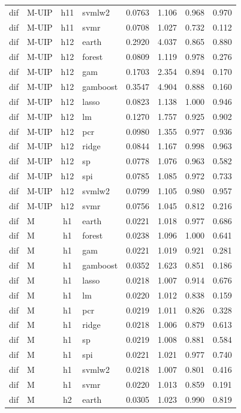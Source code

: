 \begin{ThreePartTable}
\begin{longtable}[t]{llclcccc}
dif & M-UIP & h11 & svmlw2 & 0.0763 & 1.106 & 0.968 & 0.970\\
dif & M-UIP & h11 & svmr & 0.0708 & 1.027 & 0.732 & 0.112\\
\addlinespace
dif & M-UIP & h12 & earth & 0.2920 & 4.037 & 0.865 & 0.880\\
dif & M-UIP & h12 & forest & 0.0809 & 1.119 & 0.978 & 0.276\\
dif & M-UIP & h12 & gam & 0.1703 & 2.354 & 0.894 & 0.170\\
dif & M-UIP & h12 & gamboost & 0.3547 & 4.904 & 0.888 & 0.160\\
dif & M-UIP & h12 & lasso & 0.0823 & 1.138 & 1.000 & 0.946\\
dif & M-UIP & h12 & lm & 0.1270 & 1.757 & 0.925 & 0.902\\
dif & M-UIP & h12 & pcr & 0.0980 & 1.355 & 0.977 & 0.936\\
dif & M-UIP & h12 & ridge & 0.0844 & 1.167 & 0.998 & 0.963\\
dif & M-UIP & h12 & sp & 0.0778 & 1.076 & 0.963 & 0.582\\
dif & M-UIP & h12 & spi & 0.0785 & 1.085 & 0.972 & 0.733\\
dif & M-UIP & h12 & svmlw2 & 0.0799 & 1.105 & 0.980 & 0.957\\
dif & M-UIP & h12 & svmr & 0.0756 & 1.045 & 0.812 & 0.216\\
\addlinespace
dif & M & h1 & earth & 0.0221 & 1.018 & 0.977 & 0.686\\
dif & M & h1 & forest & 0.0238 & 1.096 & 1.000 & 0.641\\
dif & M & h1 & gam & 0.0221 & 1.019 & 0.921 & 0.281\\
dif & M & h1 & gamboost & 0.0352 & 1.623 & 0.851 & 0.186\\
dif & M & h1 & lasso & 0.0218 & 1.007 & 0.914 & 0.676\\
dif & M & h1 & lm & 0.0220 & 1.012 & 0.838 & 0.159\\
dif & M & h1 & pcr & 0.0219 & 1.011 & 0.826 & 0.328\\
dif & M & h1 & ridge & 0.0218 & 1.006 & 0.879 & 0.613\\
dif & M & h1 & sp & 0.0219 & 1.008 & 0.881 & 0.584\\
dif & M & h1 & spi & 0.0221 & 1.021 & 0.977 & 0.740\\
dif & M & h1 & svmlw2 & 0.0218 & 1.007 & 0.801 & 0.416\\
dif & M & h1 & svmr & 0.0220 & 1.013 & 0.859 & 0.191\\
\addlinespace
dif & M & h2 & earth & 0.0305 & 1.023 & 0.990 & 0.819\\

\end{longtable}
\end{ThreePartTable}
